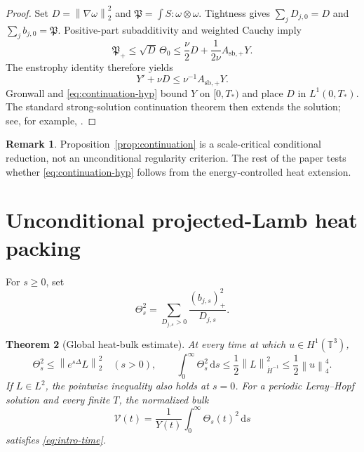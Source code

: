 \documentclass[11pt]{article}
\newtheorem{theorem}{Theorem}[section]
\theoremstyle{definition}
\newtheorem{remark}[theorem]{Remark}
\newcommand{\Torus}{\mathbb T^3}
\newcommand{\norm}[1]{\left\lVert #1\right\rVert}
\newcommand{\pos}[1]{\left(#1\right)_{+}}
\newcommand{\dd}{\,\mathrm d}
\begin{document}
\begin{proof}
Set \(D=\norm{\nabla\omega}_2^2\) and
\(\mathfrak P=\int S:\omega\otimes\omega\).  Tightness gives
\(\sum_jD_{j,0}=D\) and \(\sum_jb_{j,0}=\mathfrak P\).  Positive-part
subadditivity and weighted Cauchy imply
\[
 \mathfrak P_+
 \le \sqrt D\,\Theta_0
 \le \frac\nu2D+\frac1{2\nu}A_{\mathrm{sb},+}Y.
\]
The enstrophy identity therefore yields
\[
 Y'+\nu D\le\nu^{-1}A_{\mathrm{sb},+}Y.
\]
Gronwall and \eqref{eq:continuation-hyp} bound \(Y\) on \([0,T_*)\) and
place \(D\) in \(L^1(0,T_*)\).  The standard strong-solution continuation
theorem then extends the solution; see, for example,
\citet{FujitaKato1964,Kato1984,Temam2001}.
\end{proof}

\begin{remark}
Proposition~\ref{prop:continuation} is a scale-critical conditional
reduction, not an unconditional regularity criterion.  The rest of the paper
tests whether \eqref{eq:continuation-hyp} follows from the energy-controlled
heat extension.
\end{remark}

\section{Unconditional projected-Lamb heat packing}\label{sec:bulk}

For \(s\ge0\), set
\begin{equation}\label{eq:Theta}
 \Theta_s^2
 =\sum_{D_{j,s}>0}\frac{\pos{b_{j,s}}^2}{D_{j,s}}.
\end{equation}

\begin{theorem}[Global heat-bulk estimate]\label{thm:global-bulk}
At every time at which \(u\in H^1(\Torus)\),
\begin{equation}\label{eq:bulk-main}
 \Theta_s^2\le\norm{e^{s\Delta}L}_2^2\quad(s>0),
 \qquad
 \int_0^\infty\Theta_s^2\dd s
 \le\frac12\norm{L}_{\dot H^{-1}}^2
 \le\frac12\norm{u}_4^4.
\end{equation}
If \(L\in L^2\), the pointwise inequality also holds at \(s=0\).
For a periodic Leray--Hopf solution and every finite \(T\), the normalized
bulk
\begin{equation}\label{eq:Vdef}
 \mathcal V(t)=\frac1{Y(t)}\int_0^\infty\Theta_s(t)^2\dd s
\end{equation}
satisfies \eqref{eq:intro-time}.
\end{theorem}
\end{document}
